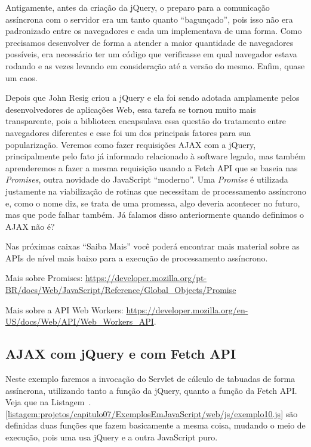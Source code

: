 Antigamente, antes da criação da jQuery, o preparo para a comunicação assíncrona com o servidor era um tanto quanto ``bagunçado'', pois isso não era padronizado entre os navegadores e cada um implementava de uma forma. Como precisamos desenvolver de forma a atender a maior quantidade de navegadores possíveis, era necessário ter um código que verificasse em qual navegador estava rodando e as vezes levando em consideração até a versão do mesmo. Enfim, quase um caos.

Depois que John Resig criou a jQuery e ela foi sendo adotada amplamente pelos desenvolvedores de aplicações Web, essa tarefa se tornou muito mais transparente, pois a biblioteca encapsulava essa questão do tratamento entre navegadores diferentes e esse foi um dos principais fatores para sua popularização. Veremos como fazer requisições AJAX com a jQuery, principalmente pelo fato já informado relacionado à software legado, mas também aprenderemos a fazer a mesma requisição usando a Fetch API que se baseia nas \textit{Promises}, outra novidade do JavaScript ``moderno''. Uma \textit{Promise} é utilizada justamente na viabilização de rotinas que necessitam de processamento assíncrono e, como o nome diz, se trata de uma promessa, algo deveria acontecer no futuro, mas que pode falhar também. Já falamos disso anteriormente quando definimos o AJAX não é?

Nas próximas caixas ``Saiba Mais'' você poderá encontrar mais material sobre as APIs de nível mais baixo para a execução de processamento assíncrono.

\begin{saibaMais}
    Mais sobre Promises: \url{https://developer.mozilla.org/pt-BR/docs/Web/JavaScript/Reference/Global_Objects/Promise}
\end{saibaMais}

\begin{saibaMais}
    Mais sobre a API Web Workers: \url{https://developer.mozilla.org/en-US/docs/Web/API/Web_Workers_API}.
\end{saibaMais}



\subsection{AJAX com jQuery e com Fetch API}

Neste exemplo faremos a invocação do Servlet de cálculo de tabuadas de forma assíncrona, utilizando tanto a função  da jQuery, quanto a função  da Fetch API. Veja que na Listagem~\thechapter.\ref{listagem:projetos/capitulo07/ExemplosEmJavaScript/web/js/exemplo10.js} são definidas duas funções que fazem basicamente a mesma coisa, mudando o meio de execução, pois uma usa jQuery e a outra JavaScript puro.

